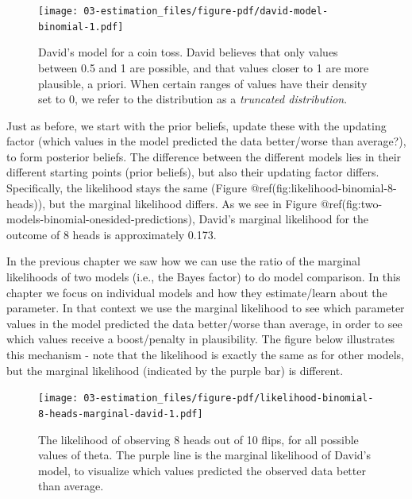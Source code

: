 \documentclass[
  letterpaper,
  DIV=11,
  numbers=noendperiod]{scrreprt}
\begin{document}
\begin{figure}

{\centering \texttt{[image: 03-estimation\_files/figure-pdf/david-model-binomial-1.pdf]}

}

\caption{David's model for a coin toss. David believes that only values
between 0.5 and 1 are possible, and that values closer to 1 are more
plausible, a priori. When certain ranges of values have their density
set to 0, we refer to the distribution as a \emph{truncated
distribution}.}

\end{figure}

Just as before, we start with the prior beliefs, update these with the
updating factor (which values in the model predicted the data
better/worse than average?), to form posterior beliefs. The difference
between the different models lies in their different starting points
(prior beliefs), but also their updating factor differs. Specifically,
the likelihood stays the same (Figure
@ref(fig:likelihood-binomial-8-heads)), but the marginal likelihood
differs. As we see in Figure
@ref(fig:two-models-binomial-onesided-predictions), David's marginal
likelihood for the outcome of 8 heads is approximately 0.173.

In the previous chapter we saw how we can use the ratio of the marginal
likelihoods of two models (i.e., the Bayes factor) to do model
comparison. In this chapter we focus on individual models and how they
estimate/learn about the parameter. In that context we use the marginal
likelihood to see which parameter values in the model predicted the data
better/worse than average, in order to see which values receive a
boost/penalty in plausibility. The figure below illustrates this
mechanism - note that the likelihood is exactly the same as for other
models, but the marginal likelihood (indicated by the purple bar) is
different.

\begin{figure}

{\centering \texttt{[image: 03-estimation\_files/figure-pdf/likelihood-binomial-8-heads-marginal-david-1.pdf]}

}

\caption{The likelihood of observing 8 heads out of 10 flips, for all
possible values of theta. The purple line is the marginal likelihood of
David's model, to visualize which values predicted the observed data
better than average.}

\end{figure}
\end{document}

